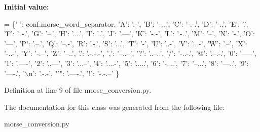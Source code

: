 {\bfseries Initial value\+:}
\begin{DoxyCode}
=  \{\textcolor{stringliteral}{' '}: conf.morse\_word\_separator,
             \textcolor{stringliteral}{'A'}: \textcolor{stringliteral}{'.-'}, \textcolor{stringliteral}{'B'}: \textcolor{stringliteral}{'-...'}, \textcolor{stringliteral}{'C'}: \textcolor{stringliteral}{'-.-.'}, \textcolor{stringliteral}{'D'}: \textcolor{stringliteral}{'-..'}, \textcolor{stringliteral}{'E'}: \textcolor{stringliteral}{'.'}, \textcolor{stringliteral}{'F'}: \textcolor{stringliteral}{'..-.'},
             \textcolor{stringliteral}{'G'}: \textcolor{stringliteral}{'--.'}, \textcolor{stringliteral}{'H'}: \textcolor{stringliteral}{'....'}, \textcolor{stringliteral}{'I'}: \textcolor{stringliteral}{'..'}, \textcolor{stringliteral}{'J'}: \textcolor{stringliteral}{'.---'}, \textcolor{stringliteral}{'K'}: \textcolor{stringliteral}{'-.-'}, \textcolor{stringliteral}{'L'}: \textcolor{stringliteral}{'.-..'},
             \textcolor{stringliteral}{'M'}: \textcolor{stringliteral}{'--'}, \textcolor{stringliteral}{'N'}: \textcolor{stringliteral}{'-.'}, \textcolor{stringliteral}{'O'}: \textcolor{stringliteral}{'---'}, \textcolor{stringliteral}{'P'}: \textcolor{stringliteral}{'.--.'}, \textcolor{stringliteral}{'Q'}: \textcolor{stringliteral}{'--.-'}, \textcolor{stringliteral}{'R': '}.-.',
             \textcolor{stringliteral}{'S'}: \textcolor{stringliteral}{'...'}, \textcolor{stringliteral}{'T'}: \textcolor{stringliteral}{'-'}, \textcolor{stringliteral}{'U': '}..-', 'V': '...-', 'W': '.--', 'X': '-..-',
             \textcolor{stringliteral}{'Y'}: \textcolor{stringliteral}{'-.--'}, \textcolor{stringliteral}{'Z'}: \textcolor{stringliteral}{'--..'}, \textcolor{stringliteral}{'.'}: \textcolor{stringliteral}{'.-.-.-'}, \textcolor{stringliteral}{','}: \textcolor{stringliteral}{'--..--'}, \textcolor{stringliteral}{'?'}: \textcolor{stringliteral}{'..--..'},
             \textcolor{stringliteral}{'/'}: \textcolor{stringliteral}{'-..-.'}, \textcolor{stringliteral}{'@'}: \textcolor{stringliteral}{'.--.-.'},
             \textcolor{stringliteral}{'0'}: \textcolor{stringliteral}{'-----'}, \textcolor{stringliteral}{'1'}: \textcolor{stringliteral}{'.----'}, \textcolor{stringliteral}{'2'}: \textcolor{stringliteral}{'..---'}, \textcolor{stringliteral}{'3'}: \textcolor{stringliteral}{'...--'}, \textcolor{stringliteral}{'4'}: \textcolor{stringliteral}{'....-'},
             \textcolor{stringliteral}{'5'}: \textcolor{stringliteral}{'.....'}, \textcolor{stringliteral}{'6'}: \textcolor{stringliteral}{'-....'}, \textcolor{stringliteral}{'7'}: \textcolor{stringliteral}{'--...'}, \textcolor{stringliteral}{'8'}: \textcolor{stringliteral}{'---..'}, \textcolor{stringliteral}{'9'}: \textcolor{stringliteral}{'----.'},
             \textcolor{stringliteral}{'\(\backslash\)n'}: \textcolor{stringliteral}{'.-.-'}, \textcolor{stringliteral}{"'"}: \textcolor{stringliteral}{'.----.'}, \textcolor{stringliteral}{'!'}: \textcolor{stringliteral}{'-.-.--'}
             \}
\end{DoxyCode}


Definition at line 9 of file morse\+\_\+conversion.\+py.



The documentation for this class was generated from the following file\+:\begin{DoxyCompactItemize}
\item 
morse\+\_\+conversion.\+py\end{DoxyCompactItemize}
